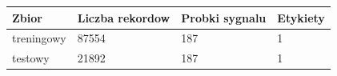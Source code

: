\begin{tabular}{llll}
\toprule
Zbior & Liczba rekordow & Probki sygnalu & Etykiety \\
\midrule
treningowy & 87554 & 187 & 1 \\
testowy & 21892 & 187 & 1 \\
\bottomrule
\end{tabular}
